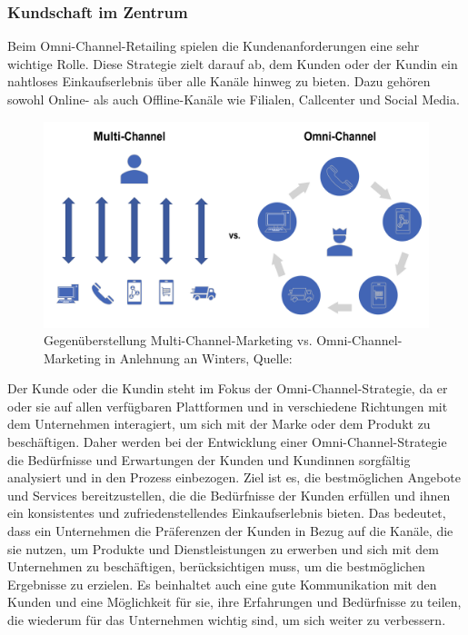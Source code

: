 \subsubsection{Kundschaft im Zentrum}\label{unterabschnitt_3_4_1}
Beim Omni-Channel-Retailing spielen die Kundenanforderungen eine sehr wichtige Rolle. Diese Strategie zielt darauf ab, dem Kunden oder der Kundin ein nahtloses Einkaufserlebnis über alle Kanäle hinweg zu bieten. Dazu gehören sowohl Online- als auch Offline-Kanäle wie Filialen, Callcenter und Social Media.

\begin{figure}[!ht]
    \centering
    \includegraphics[width=1\textwidth,angle=0]{src/abbildungen/Multi-vs-Omni.png}
    \caption[Quelle: Omni-Channel Retailing S. 10, 2021]{Gegenüberstellung Multi-Channel-Marketing vs. Omni-Channel-Marketing in Anlehnung an Winters, Quelle: \autocite {Winters2021}}
   \label{fig: Quelle: omni_channel_retailing_2021}
   \end{figure}



Der Kunde oder die Kundin steht im Fokus der Omni-Channel-Strategie, da er oder sie auf allen verfügbaren Plattformen und in verschiedene Richtungen mit dem Unternehmen interagiert, um sich mit der Marke oder dem Produkt zu beschäftigen. Daher werden bei der Entwicklung einer Omni-Channel-Strategie die Bedürfnisse und Erwartungen der Kunden und Kundinnen sorgfältig analysiert und in den Prozess einbezogen. Ziel ist es, die bestmöglichen Angebote und Services bereitzustellen, die die Bedürfnisse der Kunden erfüllen und ihnen ein konsistentes und zufriedenstellendes Einkaufserlebnis bieten. Das bedeutet, dass ein Unternehmen die Präferenzen der Kunden in Bezug auf die Kanäle, die sie nutzen, um Produkte und Dienstleistungen zu erwerben und sich mit dem Unternehmen zu beschäftigen, berücksichtigen muss, um die bestmöglichen Ergebnisse zu erzielen. Es beinhaltet auch eine gute Kommunikation mit den Kunden und eine Möglichkeit für sie, ihre Erfahrungen und Bedürfnisse zu teilen, die wiederum für das Unternehmen wichtig sind, um sich weiter zu verbessern.
\newline

